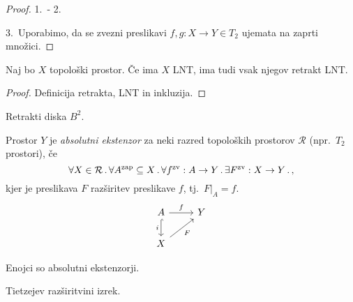\begin{proof}
    1.\ - 2.\ \todo{}

    3.\ Uporabimo, da se zvezni preslikavi \(f, g: X \to Y \in T_2\) ujemata na zaprti množici.
\end{proof}

\begin{trditev}
    Naj bo \(X\) topološki prostor. Če ima \(X\) LNT, ima tudi vsak njegov retrakt LNT.
\end{trditev}

\begin{proof}
    Definicija retrakta, LNT in inkluzija.
\end{proof}

\begin{primer}
    Retrakti diska \(B^2\). 
\end{primer}

\begin{definicija}
    Prostor \(Y\) je \emph{absolutni ekstenzor} za neki razred topoloških prostorov \(\mathcal{R}\) (npr.\ \(T_2\) prostori), če 
    \[\forall X \in \mathcal{R} \,.\, \forall A^{\text{zap}} \subseteq X \,.\, \forall f^\text{zv}: A \to Y \,.\, \exists F^\text{zv}: X \to Y \,.\,,\]
    kjer je preslikava \(F\) razširitev preslikave \(f\), tj.\ \(F|_A = f\).
    \[
    \begin{tikzcd}
        A \arrow{r}{f} \arrow[swap, hook]{d}{i} & Y \\
        X \arrow[swap]{ru}{F}
    \end{tikzcd}
    \]
\end{definicija}

\begin{primer}
    Enojci so absolutni ekstenzorji.
\end{primer}

\begin{opomba}
    Tietzejev razširitvini izrek.
\end{opomba}